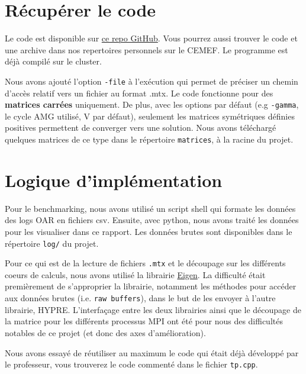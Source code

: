 \documentclass[10pt,twocolumn,letterpaper]{article}
\def\code#1{\texttt{#1}}
\begin{document}
\section{Récupérer le code}
Le code est disponible sur
\href{https://github.com/Aympab/HypreBoomerAMG_Benchmark}{ce repo GitHub}.
Vous pourrez aussi trouver le code et une archive dans nos repertoires
personnels sur le CEMEF. Le programme est déjà compilé sur le cluster.

Nous avons ajouté l'option \code{-file} à l'exécution qui permet de préciser
un chemin d'accès relatif vers un fichier au format .mtx. Le code fonctionne
pour des \textbf{matrices carrées} uniquement. De plus, avec les options par
défaut (e.g \code{-gamma}, le cycle AMG utilisé, V par défaut), seulement les
matrices symétriques définies positives permettent de converger vers une
solution. Nous avons téléchargé quelques matrices de ce type dans le répertoire
\code{matrices}, à la racine du projet.

\section{Logique d'implémentation}

Pour le benchmarking, nous avons utilisé un script shell qui formate les données
des logs OAR en fichiers csv.
Ensuite, avec python, nous avons
traité les données pour les visualiser dans ce rapport.
Les données brutes sont disponibles dans le répertoire \code{log/} du projet.

Pour ce qui est de la lecture de fichiers \code{.mtx} et le découpage sur les
différents coeurs de calculs, nous avons utilisé la librairie
\href{https://eigen.tuxfamily.org/index.php?title=Main_Page}{Eigen}.
La difficulté était premièrement de s'approprier la librairie, notamment les
méthodes pour accéder aux données brutes (i.e. \code{raw buffers}), dans le but
de les envoyer à l'autre librairie, HYPRE. L'interfaçage entre les deux
librairies ainsi que le découpage de la matrice pour les différents processus
MPI ont été pour nous des difficultés notables de ce projet (et donc des axes
d'amélioration).

Nous avons essayé de réutiliser au maximum le code qui était déjà développé par
le professeur, vous trouverez le code commenté dans le fichier \code{tp.cpp}.
\end{document}
